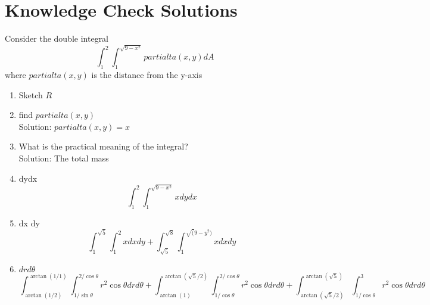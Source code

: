 \documentclass[11pt]{article}
\begin{document}
\section{Knowledge Check Solutions}
Consider the double integral
\[\int_{1}^{2} \int_{1}^{\sqrt{9-x^{2}}} partialta(x,y) dA\]
where $partialta(x,y)$ is the distance from the y-axis
\begin{enumerate}
  \item Sketch $R$ \\
  \item find $partialta(x,y)$ \\
        Solution: $partialta(x,y) = x$
  \item What is the practical meaning of the integral?\\
        Solution: The total mass
  \item dydx
        \[\int_{1}^{2}\int_{1}^{\sqrt{9-x^{2}}} x dy dx\]
  \item dx dy
    \[\int_{1}^{\sqrt{5}} \int_{1}^{2} x dx dy + \int_{\sqrt{5}}^{\sqrt{8}} \int_{1}^{\sqrt(9-y^{2})} x dx dy \]
  \item $dr d\theta$
        \[\int_{\arctan(1/2)}^{\arctan(1/1)} \int_{1/\sin\theta}^{2/\cos\theta} r^{2}\cos\theta dr d\theta + \int_{\arctan(1)}^{\arctan(\sqrt{5}/2)} \int_{1/\cos\theta}^{2/\cos\theta} r^{2}\cos\theta dr d\theta
        + \int_{\arctan(\sqrt{5}/2)}^{\arctan(\sqrt{5})} \int_{1/\cos\theta}^{3} r^{2}\cos\theta drd\theta\]


\end{enumerate}
\end{document}
